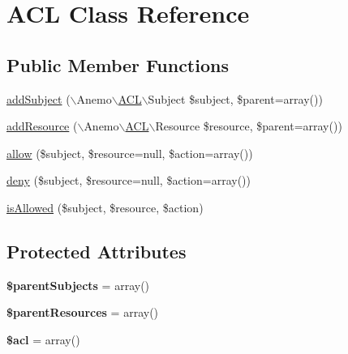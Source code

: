 \hypertarget{class_anemo_1_1_a_c_l}{
\section{ACL Class Reference}
\label{class_anemo_1_1_a_c_l}
}
\subsection*{Public Member Functions}
\begin{DoxyCompactItemize}
\item 
\hyperlink{class_anemo_1_1_a_c_l_a70b2e78ff162eff6413e3a4fee342692}{addSubject} ($\backslash$Anemo$\backslash$\hyperlink{class_anemo_1_1_a_c_l}{ACL}$\backslash$Subject \$subject, \$parent=array())
\item 
\hyperlink{class_anemo_1_1_a_c_l_a21012582653973087f10147151727198}{addResource} ($\backslash$Anemo$\backslash$\hyperlink{class_anemo_1_1_a_c_l}{ACL}$\backslash$Resource \$resource, \$parent=array())
\item 
\hyperlink{class_anemo_1_1_a_c_l_a07bc8d3c0e088693858b0535f150d136}{allow} (\$subject, \$resource=null, \$action=array())
\item 
\hyperlink{class_anemo_1_1_a_c_l_acb2fb7d69d163b8f13c99492b402e471}{deny} (\$subject, \$resource=null, \$action=array())
\item 
\hyperlink{class_anemo_1_1_a_c_l_a7dd7085d9ca64b04d068f3982d86c4b2}{isAllowed} (\$subject, \$resource, \$action)
\end{DoxyCompactItemize}
\subsection*{Protected Attributes}
\begin{DoxyCompactItemize}
\item 
\hypertarget{class_anemo_1_1_a_c_l_a24d761413df70e449c0f7aa0243ada47}{
{\bfseries \$parentSubjects} = array()}
\label{class_anemo_1_1_a_c_l_a24d761413df70e449c0f7aa0243ada47}

\item 
\hypertarget{class_anemo_1_1_a_c_l_a230896d04cc88e5b5156e27a0daba158}{
{\bfseries \$parentResources} = array()}
\label{class_anemo_1_1_a_c_l_a230896d04cc88e5b5156e27a0daba158}

\item 
\hypertarget{class_anemo_1_1_a_c_l_a896b3f6f6b6fea4856526607cf007d3e}{
{\bfseries \$acl} = array()}
\label{class_anemo_1_1_a_c_l_a896b3f6f6b6fea4856526607cf007d3e}

\end{DoxyCompactItemize}
